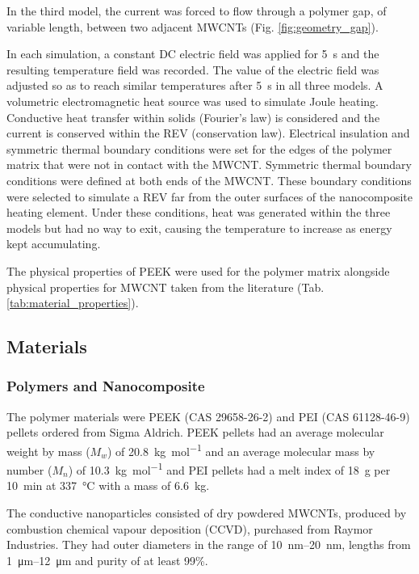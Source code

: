 \documentclass[11pt,review,times]{elsarticle}
\begin{document}
In the third model, the current was forced to flow through a polymer gap, of variable length, between two adjacent MWCNTs (Fig. \ref{fig:geometry_gap}). 

In each simulation, a constant DC electric field was applied for \SI{5}{\second} and the resulting temperature field was recorded. 
The value of the electric field was adjusted so as to reach similar temperatures after \SI{5}{\second} in all three models. 
A volumetric electromagnetic heat source was used to simulate Joule heating. 
Conductive heat transfer within solids (Fourier's law) is considered and the current is conserved within the REV (conservation law). 
Electrical insulation and symmetric thermal boundary conditions were set for the edges of the polymer matrix that were not in contact with the MWCNT. 
Symmetric thermal boundary conditions were defined at both ends of the MWCNT. 
These boundary conditions were selected to simulate a REV far from the outer surfaces of the nanocomposite heating element. 
Under these conditions, heat was generated within the three models but had no way to exit, causing the temperature to increase as energy kept accumulating.

The physical properties of PEEK were used for the polymer matrix alongside physical properties for MWCNT taken from the literature (Tab. \ref{tab:material_properties}). 

\subsection{Materials}

\subsubsection{Polymers and Nanocomposite}

The polymer materials were PEEK (CAS 29658-26-2) and PEI (CAS 61128-46-9) pellets ordered from Sigma Aldrich. 
PEEK pellets had an average molecular weight by mass ($M_w$) of \SI{20,8}{\kilo\gram\per\mol} and an average molecular mass by number ($M_n$) of \SI{10,3}{\kilo\gram\per\mol} and PEI pellets had a melt index of \SI{18}{\gram} per \SI{10}{\minute} at \SI{337}{\celsius} with a mass of \SI{6.6}{\kilogram}. 

The conductive nanoparticles consisted of dry powdered MWCNTs, produced by combustion chemical vapour deposition (CCVD), purchased from Raymor Industries. 
They had outer diameters in the range of \SIrange{10}{20}{\nano\metre}, lengths from \SIrange{1}{12}{\micro\metre} and purity of at least 99\%.
\end{document}
